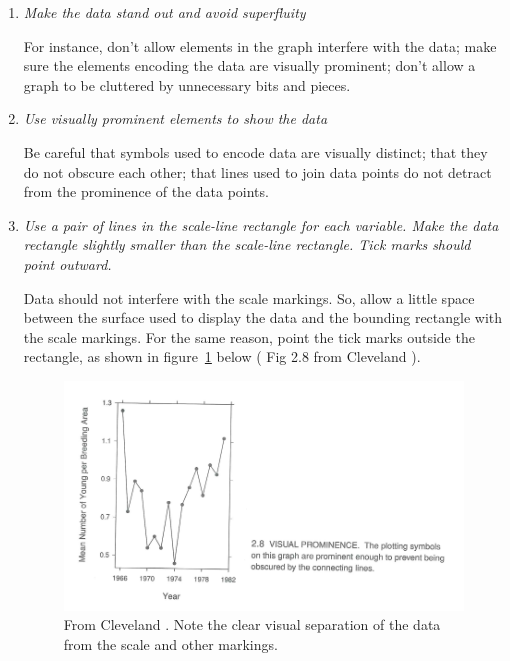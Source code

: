 \begin{enumerate}

\item	\textit{Make the data stand out and avoid superfluity}

For instance, don’t allow elements in the graph interfere with the data; make sure the elements encoding the data are visually prominent; don’t allow a graph to be cluttered by unnecessary bits and pieces.

\item	\textit{Use visually prominent elements to show the data}

Be careful that symbols used to encode data are visually distinct; that they do not obscure each other; that lines used to join data points do not detract from the prominence of the data points.

\item	\textit{Use a pair of lines in the scale-line rectangle for each variable. Make the data rectangle slightly smaller than the scale-line rectangle. Tick marks should point outward.}

Data should not interfere with the scale markings. So, allow a little space between the surface used to display the data and the bounding rectangle with the scale markings. For the same reason, point the tick marks outside the rectangle, as shown in figure~\ref{fig:cleveland_promience} below ( Fig 2.8 from Cleveland \cite{Cleveland} ).

\begin{figure}[ht]
\centering
\includegraphics[scale=1]{pictures/visual_prominence}
\caption{From Cleveland \cite{Cleveland}. Note the clear visual separation of the data from the scale and other markings.}
\label{fig:cleveland_promience}
\end{figure}


\end{enumerate}
